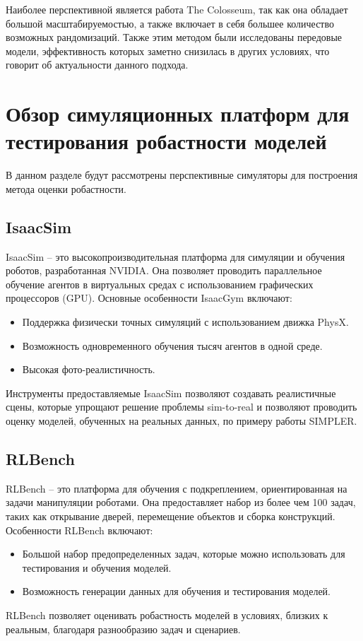         Наиболее перспективной является работа The Colosseum, так как она обладает большой масштабируемостью, а также включает в себя большее количество возможных рандомизаций. Также этим методом были исследованы передовые модели, эффективность которых заметно снизилась в других условиях, что говорит об актуальности данного подхода.
        
    \section{Обзор симуляционных платформ для тестирования робастности моделей}
    
        В данном разделе будут рассмотрены перспективные симуляторы для построения метода оценки робастности.
    
        \subsection{IsaacSim}
        IsaacSim \cite{nvidia_isaac_sim} -- это высокопроизводительная платформа для симуляции и обучения роботов, разработанная NVIDIA. Она позволяет проводить параллельное обучение агентов в виртуальных средах с использованием графических процессоров (GPU). Основные особенности IsaacGym включают:
        \begin{itemize}
            \item Поддержка физически точных симуляций с использованием движка PhysX.
            \item Возможность одновременного обучения тысяч агентов в одной среде.
            \item Высокая фото-реалистичность.
        \end{itemize}
        
        Инструменты предоставляемые IsaacSim позволяют создавать реалистичные сцены, которые упрощают решение проблемы sim-to-real и позволяют проводить оценку моделей, обученных на реальных данных, по примеру работы SIMPLER.
        
        \subsection{RLBench}
        RLBench \cite{james2020rlbench} -- это платформа для обучения с подкреплением, ориентированная на задачи манипуляции роботами. Она предоставляет набор из более чем 100 задач, таких как открывание дверей, перемещение объектов и сборка конструкций. Особенности RLBench включают:
        \begin{itemize}
            \item Большой набор предопределенных задач, которые можно использовать для тестирования и обучения моделей.
            \item Возможность генерации данных для обучения и тестирования моделей.
        \end{itemize}
        RLBench позволяет оценивать робастность моделей в условиях, близких к реальным, благодаря разнообразию задач и сценариев.
        
